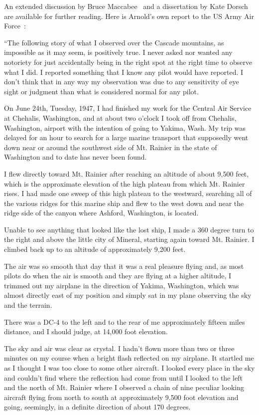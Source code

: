 An extended discussion by Bruce Maccabee~\cite{Maccabee2017Jun} and a dissertation by Kate Dorsch~\cite{Dorsch2019} are available for further reading.
Here is Arnold's own report to the US Army Air Force~\cite{Arnold47}:
\begin{svgraybox}
``The following story of what I observed over the Cascade mountains, as impossible as it may seem, is positively true. I never asked nor wanted any notoriety for just accidentally being in the right spot at the right time to observe what I did. I reported something that I know any pilot would have reported. I don't think that in any way my observation was due to any sensitivity of eye sight or judgment than what is considered normal for any pilot.

      On June 24th, Tuesday, 1947, I had finished my work for the Central Air Service at Chehalis, Washington, and at about two o'clock I took off from Chehalis, Washington, airport with the intention of going to Yakima, Wash. My trip was delayed for an hour to search for a large marine transport that supposedly went down near or around the southwest side of Mt. Rainier in the state of Washington and to date has never been found.

      I flew directly toward Mt. Rainier after reaching an altitude of about 9,500 feet, which is the approximate elevation of the high plateau from which Mt. Rainier rises. I had made one sweep of this high plateau to the westward, searching all of the various ridges for this marine ship and flew to the west down and near the ridge side of the canyon where Ashford, Washington, is located.

      Unable to see anything that looked like the lost ship, I made a 360 degree turn to the right and above the little city of Mineral, starting again toward Mt. Rainier. I climbed back up to an altitude of approximately 9,200 feet.

      The air was so smooth that day that it was a real pleasure flying and, as most pilots do when the air is smooth and they are flying at a higher altitude, I trimmed out my airplane in the direction of Yakima, Washington, which was almost directly east of my position and simply sat in my plane observing the sky and the terrain.


There was a DC-4 to the left and to the rear of me approximately fifteen miles distance, and I should judge, at 14,000 foot elevation.

      The sky and air was clear as crystal. I hadn't flown more than two or three minutes on my course when a bright flash reflected on my airplane. It startled me as I thought I was too close to some other aircraft. I looked every place in the sky and couldn't find where the reflection had come from until I looked to the left and the north of Mt. Rainier where I observed a chain of nine peculiar looking aircraft flying from north to south at approximately 9,500 foot elevation and going, seemingly, in a definite direction of about 170 degrees.


\end{svgraybox}
